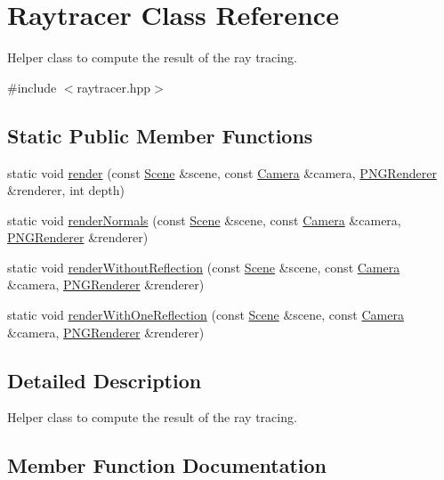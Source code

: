 \hypertarget{class_raytracer}{}\section{Raytracer Class Reference}
\label{class_raytracer}


Helper class to compute the result of the ray tracing.  




{\ttfamily \#include $<$raytracer.\+hpp$>$}

\subsection*{Static Public Member Functions}
\begin{DoxyCompactItemize}
\item 
static void \hyperlink{class_raytracer_a30fd92942bd218de87cdb07548c5b944}{render} (const \hyperlink{class_scene}{Scene} \&scene, const \hyperlink{class_camera}{Camera} \&camera, \hyperlink{class_p_n_g_renderer}{P\+N\+G\+Renderer} \&renderer, int depth)
\item 
static void \hyperlink{class_raytracer_a729eca5499f37ea67668a498434f1870}{render\+Normals} (const \hyperlink{class_scene}{Scene} \&scene, const \hyperlink{class_camera}{Camera} \&camera, \hyperlink{class_p_n_g_renderer}{P\+N\+G\+Renderer} \&renderer)
\item 
static void \hyperlink{class_raytracer_a9416ba8c371cb540365577dfee90668c}{render\+Without\+Reflection} (const \hyperlink{class_scene}{Scene} \&scene, const \hyperlink{class_camera}{Camera} \&camera, \hyperlink{class_p_n_g_renderer}{P\+N\+G\+Renderer} \&renderer)
\item 
static void \hyperlink{class_raytracer_a737a97b9111683be14489a38bf294ccf}{render\+With\+One\+Reflection} (const \hyperlink{class_scene}{Scene} \&scene, const \hyperlink{class_camera}{Camera} \&camera, \hyperlink{class_p_n_g_renderer}{P\+N\+G\+Renderer} \&renderer)
\end{DoxyCompactItemize}


\subsection{Detailed Description}
Helper class to compute the result of the ray tracing. 

\subsection{Member Function Documentation}
